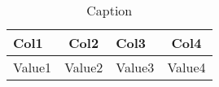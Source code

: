 
\begin{table}[h!] %
            \centering
            \renewcommand{\arraystretch}{2} %
            \begin{tabular}{|l|c|p{8cm}|c|} %
                \rowcolor{orange!50} %
        		\hline
        		\textbf{Col1} & \textbf{Col2} & \textbf{Col3} & \textbf{Col4}\\
                \hline
                Value1 & Value2 & Value3 & Value4\\
        \end{tabular}
        \caption{Caption} %
        \label{tab:my_label}
\end{table}
